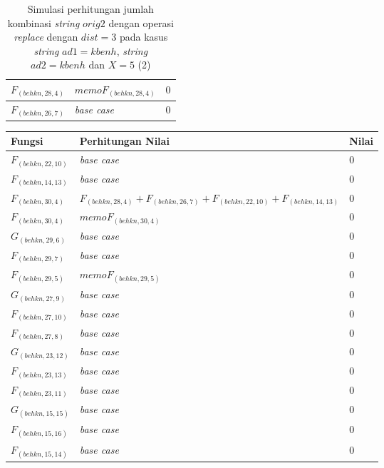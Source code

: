 \begin{appendices}
\begin{table}[H]
\begin{tabular} {|p{3cm}|p{5cm}|p{1cm}|}
  		$ F_{(behkn, 28, 4)}  $ & $memoF_{(behkn, 28, 4)}$ & $ 0 $ \\ \hline
  		$ F_{(behkn, 26, 7)} $ & \textit{base case} & $ 0 $ \\ \hline		
  	\end{tabular}\caption{Simulasi perhitungan jumlah kombinasi \textit{string} $ orig2 $ dengan operasi \textit{replace} dengan $ dist= 3  $ pada kasus \textit{string} $ ad1=kbenh $, \textit{string} $ ad2=kbenh $ dan $ X=5 $ (2)}
  	\label{tab:g_3_orig2_3_2}
  \end{table}
  \begin{table}[H]
  	\centering
  	\begin{tabular} {|p{3cm}|p{5cm}|p{1cm}|} \hline
  		Fungsi & Perhitungan Nilai & Nilai \\ \hline
  		$ F_{(behkn, 22, 10)} $ & \textit{base case} & $ 0 $ \\ \hline
  		$ F_{(behkn, 14, 13)} $ & \textit{base case} & $ 0 $ \\ \hline
  		$ F_{(behkn, 30, 4)}  $ & $F_{(behkn, 28, 4)} + F_{(behkn, 26, 7)} + F_{(behkn, 22, 10)} + F_{(behkn, 14, 13)}$ & $ 0 $ \\ \hline
  		$ F_{(behkn, 30, 4)}  $ & $memoF_{(behkn, 30, 4)}$ & $ 0 $ \\ \hline
  		$ G_{(behkn, 29, 6)} $ & \textit{base case} & $ 0 $ \\ \hline
  		$ F_{(behkn, 29, 7)} $ & \textit{base case} & $ 0 $ \\ \hline
  		$ F_{(behkn, 29, 5)}  $ & $memoF_{(behkn, 29, 5)}$ & $ 0 $ \\ \hline
  		$ G_{(behkn, 27, 9)} $ & \textit{base case} & $ 0 $ \\ \hline
  		$ F_{(behkn, 27, 10)} $ & \textit{base case} & $ 0 $ \\ \hline
  		$ F_{(behkn, 27, 8)} $ & \textit{base case} & $ 0 $ \\ \hline
  		$ G_{(behkn, 23, 12)} $ & \textit{base case} & $ 0 $ \\ \hline
  		$ F_{(behkn, 23, 13)} $ & \textit{base case} & $ 0 $ \\ \hline
  		$ F_{(behkn, 23, 11)} $ & \textit{base case} & $ 0 $ \\ \hline
  		$ G_{(behkn, 15, 15)} $ & \textit{base case} & $ 0 $ \\ \hline
  		$ F_{(behkn, 15, 16)} $ & \textit{base case} & $ 0 $ \\ \hline
  		$ F_{(behkn, 15, 14)} $ & \textit{base case} & $ 0 $ \\ \hline

\end{tabular}
\end{table}
\end{appendices}
